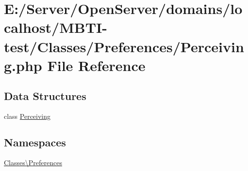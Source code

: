 \hypertarget{_perceiving_8php}{}\section{E\+:/\+Server/\+Open\+Server/domains/localhost/\+M\+B\+T\+I-\/test/\+Classes/\+Preferences/\+Perceiving.php File Reference}
\label{_perceiving_8php}
\subsection*{Data Structures}
\begin{DoxyCompactItemize}
\item 
class \hyperlink{class_classes_1_1_preferences_1_1_perceiving}{Perceiving}
\end{DoxyCompactItemize}
\subsection*{Namespaces}
\begin{DoxyCompactItemize}
\item 
 \hyperlink{namespace_classes_1_1_preferences}{Classes\textbackslash{}\+Preferences}
\end{DoxyCompactItemize}
